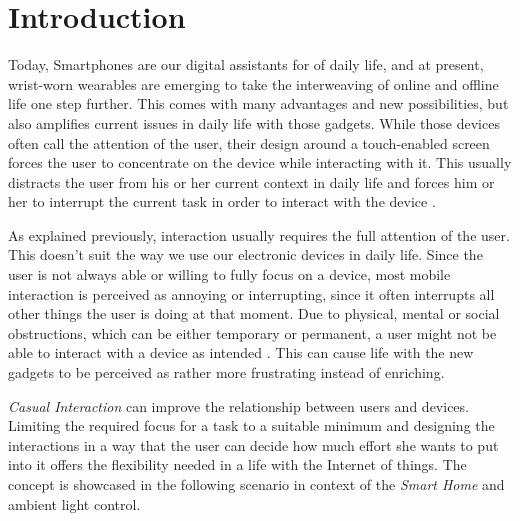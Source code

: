 \chapter{Introduction}
\label{sec:intro}
Today, Smartphones are our digital assistants for of daily life, and at present, wrist-worn wearables are emerging to take the interweaving of online and offline life one step further. This comes with many advantages and new possibilities, but also amplifies current issues in daily life with those gadgets. While those devices often call the attention of the user, their design around a touch-enabled screen forces the user to concentrate on the device while interacting with it. This usually distracts the user from his or her current context in daily life and forces him or her to interrupt the current task in order to interact with the device \cite{Pohl2013}.

As explained previously, interaction usually requires the full attention of the user. This doesn't suit the way we use our electronic devices in daily life. Since the user is not always able or willing to fully focus on a device, most mobile interaction is perceived as annoying or interrupting, since it often interrupts all other things the user is doing at that moment. Due to physical, mental or social obstructions, which can be either temporary or permanent, a user might not be able to interact with a device as intended \cite{Pohl2013}. This can cause life with the new gadgets to be perceived as rather more frustrating instead of enriching.

\textit{Casual Interaction} can improve the relationship between users and devices. Limiting the required focus for a task to a suitable minimum and designing the interactions in a way that the user can decide how much effort she wants to put into it offers the flexibility needed in a life with the Internet of things. The concept is showcased in the following scenario in context of the \textit{Smart Home} and ambient light control.

